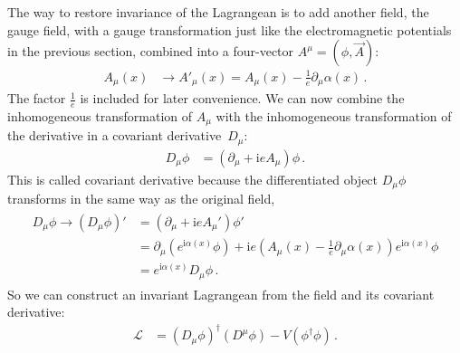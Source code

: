 \documentclass[12pt]{report}
\renewcommand{\L}{\ensuremath{\mathscr{L}}}
\renewcommand{\i}{\ensuremath{\text{i}}}
\newcommand{\2}{\ensuremath{\sqrt{2}\,}}
\renewcommand{\L}{\ensuremath{\mathscr{L}}}
\begin{document}
{      The way to restore invariance of the Lagrangean is to add another field, the gauge
      field, with a gauge transformation just like the electromagnetic potentials in the previous
      section, combined into a four-vector $A^\mu=(\phi,\vec{A})$:
      \begin{align}\label{eq:abeliantrafo}
        A_\mu(x) &\to A'_\mu(x) = A_\mu(x) - \frac{1}{e} \partial_\mu \alpha(x)\,.
      \end{align}
      The factor $\frac{1}{e}$ is included for later convenience. We can now combine the
      inhomogeneous transformation of $A_\mu$ with the inhomogeneous transformation of the
      derivative in a covariant derivative~$D_\mu$:
      \begin{align}
        D_\mu \phi &= \left(\partial_\mu +\i e A_\mu\right)\phi\,.
      \end{align}
      This is called covariant derivative because the differentiated object $D_\mu\phi$ transforms in
      the same way as the original field, 
      \begin{align}
        \begin{split}
          D_\mu \phi \longrightarrow \left(D_\mu \phi\right)' &= \left(\partial_\mu +\i e
            A_\mu'\right) \phi'\\ 
          &=\partial_\mu \left(e^{\i\alpha(x)}\phi\right)  +\i e \left(A_\mu(x) - \frac{1}{e}
            \partial_\mu \alpha(x) \right) e^{\i\alpha(x)}\phi\\ 
          &= e^{\i\alpha(x)}D_\mu \phi\,.
        \end{split}
      \end{align}
      So we can construct an invariant Lagrangean from the field and its covariant derivative:
      \begin{align}
        \L&=\left(D_\mu \phi\right)^\dagger \left(D^\mu \phi\right) -
        V\left(\phi^\dagger\phi\right)\,.
      \end{align}
      
}
\end{document}
